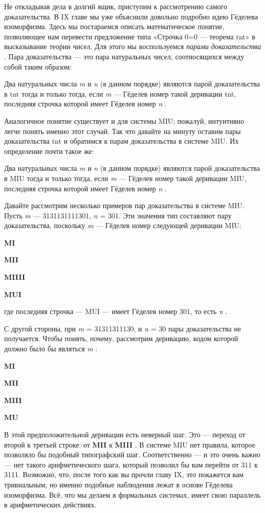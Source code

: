 \documentclass[../main.tex]{subfiles}
\begin{document}
Не откладывая дела в долгий ящик, приступим к рассмотрению самого доказательства. В IX главе мы уже объяснили довольно подробно идею Гёделева изоморфизма. Здесь мы постараемся описать математическое понятие, позволяющее нам перевести предложение типа «Строчка 0=0 --- теорема \acs{tnt}» в высказывание теории чисел. Для этого мы воспользуемся \emph{парами доказательства} . Пара доказательства --- это пара натуральных чисел, соотносящихся между собой таким образом:

Два натуральных числа \emph{m} и \emph{n} (в данном порядке) являются парой доказательства в \acs{tnt} тогда и только тогда, если \emph{m} --- Гёделев номер такой деривации \acs{tnt}, последняя строчка которой имеет Гёделев номер \emph{n} .

Аналогичное понятие существует и для системы MIU; пожалуй, интуитивно легче понять именно этот случай. Так что давайте на минуту оставим пары доказательства \acs{tnt} и обратимся к парам доказательства в системе MIU\@. Их определение почти такое же:

Два натуральных числа \emph{m} и \emph{n} (в данном порядке) являются парой доказательства в MIU тогда и только тогда, если \emph{m} --- Гёделев номер такой деривации MIU, последняя строчка которой имеет Гёделев номер \emph{n} .

Давайте рассмотрим несколько примеров пар доказательства в системе MIU\@. Пусть \emph{m} --- 3131131111301, \emph{n} = 301. Эти значения тип составляют пару доказательства, поскольку \emph{m} --- Гёделев номер следующей деривации MIU:

\textbf{MI}

\textbf{MII}

\textbf{MIIII}

\textbf{MUI}

где последняя строчка --- MUI --- имеет Гёделев номер 301, то есть \emph{n} .

С другой стороны, при \emph{m} = 31311311130, и \emph{n} = 30 пары доказательства не получается. Чтобы понять, почему, рассмотрим деривацию, кодом которой должно было бы являться \emph{m} :

\textbf{MI}

\textbf{MII}

\textbf{MIII}

\textbf{MU}

В этой предположительной деривации есть неверный шаг. Это --- переход от второй к третьей строке: от \textbf{MII} к \textbf{MIII} . В системе MIU нет правила, которое позволяло бы подобный типографский шаг. Соответственно --- и это очень важно --- нет такого арифметического шага, который позволил бы вам перейти от 311 к 3111. Возможно, что, после того как вы прочли главу IX, это покажется вам тривиальным, но именно подобные наблюдения лежат в основе Гёделева изоморфизма. Всё, что мы делаем в формальных системах, имеет свою параллель в арифметических действиях.
\end{document}
